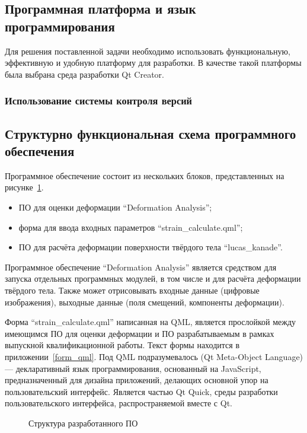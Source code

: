 \subsection {Программная платформа и язык программирования}
Для решения поставленной задачи необходимо использовать функциональную, эффективную и удобную платформу для разработки. В качестве такой платформы была выбрана среда разработки Qt Creator.

\subsubsection {Использование системы контроля версий}

\subsection{Структурно функциональная схема программного обеспечения}%

Программное обеспечение состоит из нескольких блоков, представленных на рисунке~\ref{pic:shema_PO}.

\begin{itemize}
\item ПО для оценки деформации ``Deformation Analysis'';
\item форма для ввода входных параметров ``strain\_calculate.qml'';
\item ПО для расчёта деформации поверхности твёрдого тела ``lucas\_kanade''.
\end{itemize}

Программное обеспечение ``Deformation Analysis'' является средством для запуска отдельных программных модулей, в том числе и для расчёта деформации твёрдого тела. Также может отрисовывать входные данные (цифровые изображения), выходные данные (поля смещений, компоненты деформации). 

Форма ``strain\_calculate.qml'' написанная на QML, является прослойкой между имеющимся ПО для оценки деформации и ПО разрабатываемым в рамках выпускной квалификационной работы. Текст формы находится в приложении~\ref{form_qml}. Под QML подразумевалось (Qt Meta-Object Language) — декларативный язык программирования, основанный на JavaScript, предназначенный для дизайна приложений, делающих основной упор на пользовательский интерфейс. Является частью Qt Quick, среды разработки пользовательского интерфейса, распространяемой вместе с Qt.

\begin{figure}[h!]
\caption{Структура разработанного ПО}
\label{pic:shema_PO}
\end{figure}

